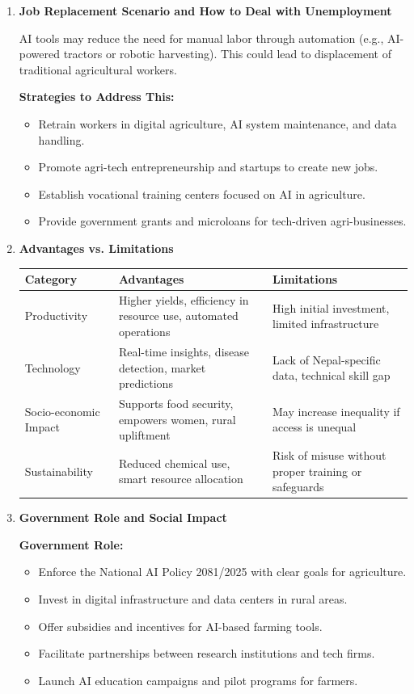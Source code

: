 \begin{answer}
\begin{enumerate}
  \item \textbf{Job Replacement Scenario and How to Deal with Unemployment}

AI tools may reduce the need for manual labor through automation (e.g., AI-powered tractors or robotic harvesting). This could lead to displacement of traditional agricultural workers.

\textbf{Strategies to Address This:}
\begin{itemize}
  \item Retrain workers in digital agriculture, AI system maintenance, and data handling.
  \item Promote agri-tech entrepreneurship and startups to create new jobs.
  \item Establish vocational training centers focused on AI in agriculture.
  \item Provide government grants and microloans for tech-driven agri-businesses.
\end{itemize}

  \item \textbf{Advantages vs. Limitations}

\begin{tabular}{|p{4cm}|p{5cm}|p{5cm}|}
\hline
\textbf{Category} & \textbf{Advantages} & \textbf{Limitations} \\
\hline
Productivity & Higher yields, efficiency in resource use, automated operations & High initial investment, limited infrastructure \\
\hline
Technology & Real-time insights, disease detection, market predictions & Lack of Nepal-specific data, technical skill gap \\
\hline
Socio-economic Impact & Supports food security, empowers women, rural upliftment & May increase inequality if access is unequal \\
\hline
Sustainability & Reduced chemical use, smart resource allocation & Risk of misuse without proper training or safeguards \\
\hline
\end{tabular}

  \item \textbf{Government Role and Social Impact}

\textbf{Government Role:}
\begin{itemize}
  \item Enforce the National AI Policy 2081/2025 with clear goals for agriculture.
  \item Invest in digital infrastructure and data centers in rural areas.
  \item Offer subsidies and incentives for AI-based farming tools.
  \item Facilitate partnerships between research institutions and tech firms.
  \item Launch AI education campaigns and pilot programs for farmers.
\end{itemize}


\end{enumerate}
\end{answer}
